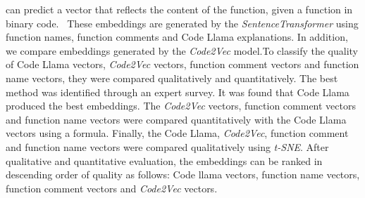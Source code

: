 \documentclass[12pt,letterpaper,ngerman]{article}
\begin{document}
can predict a vector that reflects the content of the function, 
given a function in binary code. 
These embeddings are generated by the \textit{SentenceTransformer}
\cite{reimers-2019-sentence-bert}
using function names, function comments and Code Llama 
\cite{rozière2024codellamaopenfoundation}
explanations.
In addition, we compare embeddings generated by the \textit{Code2Vec}
\cite{code2vec}
model.To classify the quality of Code Llama vectors,
\textit{Code2Vec} vectors, function comment vectors 
and function name vectors, they were compared qualitatively
and quantitatively.
The best method was identified through an expert survey.  
It was found that Code Llama produced the best embeddings. 
The \textit{Code2Vec} vectors, function comment vectors and
function name vectors were compared quantitatively with the
Code Llama vectors using a formula. 
Finally, the Code Llama, \textit{Code2Vec},  function comment 
and function name vectors were 
compared qualitatively using \textit{t-SNE}. 
After qualitative and quantitative evaluation, the embeddings can 
be ranked in descending order of quality as follows: 
Code llama vectors, function name vectors, function comment vectors 
and \textit{Code2Vec} vectors.
\newpage
\tableofcontents
\newpage

\setcounter{page}{1}
\pagestyle{fancy}
\fancyhf{}
\fancyhead[R]{\thepage}
\renewcommand{\headrulewidth}{0pt} %
\newtheorem{definition}{Definition}
\end{document}
